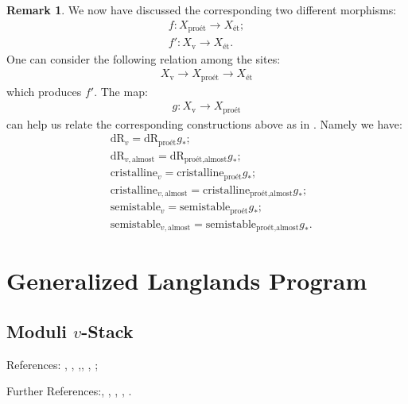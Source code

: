 \documentclass[12pt]{book}
\theoremstyle{definition}
\newtheorem{remark}{Remark}
\begin{document}
\begin{remark}
We now have discussed the corresponding two different morphisms:
\begin{align}
f: X_\text{pro\'et}\longrightarrow X_\text{\'et};\\
f': X_\text{v}\longrightarrow X_\text{\'et}.
\end{align}
One can consider the following relation among the sites:
\begin{align}
X_\text{v}\longrightarrow X_\text{pro\'et}\longrightarrow X_\text{\'et}
\end{align}
which produces $f'$. The map:
\begin{align}
g: X_\text{v}\longrightarrow X_\text{pro\'et}
\end{align}
can help us relate the corresponding constructions above as in \cite[Proposition 2.37]{B}. Namely we have:
\begin{align}
&\mathrm{dR}_{v}=\mathrm{dR}_{\text{pro\'et}}g_*;\\
&\mathrm{dR}_{v,\text{almost}}=\mathrm{dR}_{\text{pro\'et},\text{almost}}g_*;\\
&\mathrm{cristalline}_{v}=\mathrm{cristalline}_{\text{pro\'et}}g_*;\\
&\mathrm{cristalline}_{v,\text{almost}}=\mathrm{cristalline}_{\text{pro\'et},\text{almost}}g_*;\\
&\mathrm{semistable}_{v}=\mathrm{semistable}_{\text{pro\'et}}g_*;\\
&\mathrm{semistable}_{v,\text{almost}}=\mathrm{semistable}_{\text{pro\'et},\text{almost}}g_*.
\end{align} 
\end{remark}










\chapter{Generalized Langlands Program}

\newpage
\section{Moduli $v$-Stack}

\noindent References: \cite{FS}, \cite{FF}, \cite{Sch1},\cite{Sch2}, \cite{KL1}, \cite{KL2};

\noindent Further References:\cite{Lan1}, \cite{Drin1}, \cite{Drin2}, \cite{Zhu}, \cite{DHKM}.\\
\end{document}

